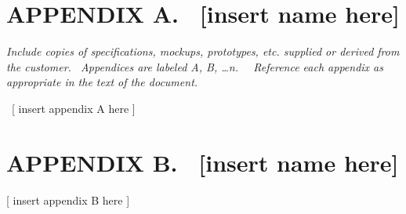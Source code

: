 \documentclass[twoside,letterpaper]{article}
\begin{document}
\section[APPENDIX A. \ [insert name
here{]}]{\rmfamily\bfseries\color{black}
APPENDIX A. \ [insert name here]}

\bigskip

{\itshape\color{black}
Include copies of specifications, mockups, prototypes, etc. supplied or
derived from the customer. \ Appendices are labeled A, B, {\dots}n.
\ \ Reference each appendix as appropriate in the text of the document.
}

{\color{black}
\foreignlanguage{english}{\ }\foreignlanguage{english}{[ insert appendix
A here ]}}

\clearpage\pagestyle{Appendix}
\section[APPENDIX B. \ [insert name
here{]}]{\rmfamily\bfseries\color{black}
APPENDIX B. \ [insert name here]}

\bigskip

{\color{black}
[ insert appendix B here ]}

\bigskip
\end{document}

